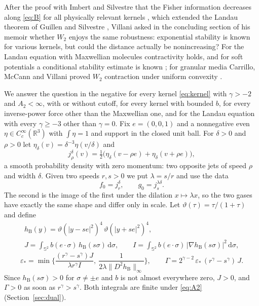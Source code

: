 \documentclass[11pt]{amsart}
\theoremstyle{definition}
\newcommand{\RR}{\mathbb{R}}
\newcommand{\Sph}{\mathbb{S}}
\newcommand{\dd}{\,\mathrm{d}}
\newcommand{\hB}{h_{\mathrm B}}
\begin{document}
After the proof with Imbert and Silvestre that the Fisher information decreases along \eqref{eq:B} for all physically relevant kernels \cite{ISV25}, which extended the Landau theorem of Guillen and Silvestre \cite{GS25}, Villani asked in the concluding section of his memoir \cite{Vil25} whether $W_2$ enjoys the same robustness: exponential stability is known for various kernels, but could the distance actually be nonincreasing? For the Landau equation with Maxwellian molecules contractivity holds, and for soft potentials a conditional stability estimate is known \cite{CDGT25}; for granular media Carrillo, McCann and Villani proved $W_2$ contraction under uniform convexity \cite{CMV05}.

We answer the question in the negative for every kernel \eqref{eq:kernel} with $\gamma>-2$ and $A_2<\infty$, with or without cutoff, for every kernel with bounded $b$, for every inverse-power force other than the Maxwellian one, and for the Landau equation with every $\gamma\ge-3$ other than $\gamma=0$. Fix $e=(0,0,1)$ and a nonnegative even $\eta\in C_c^\infty(\RR^3)$ with $\int\eta=1$ and support in the closed unit ball. For $\delta>0$ and $\rho>0$ let $\eta_\delta(v)=\delta^{-3}\eta(v/\delta)$ and
\begin{equation}\label{eq:data}
j^\delta_\rho(v)=\tfrac12\big(\eta_\delta(v-\rho e)+\eta_\delta(v+\rho e)\big),
\end{equation}
a smooth probability density with zero momentum: two opposite jets of speed $\rho$ and width $\delta$. Given two speeds $r,s>0$ we put $\lambda=s/r$ and use the data
\begin{equation}\label{eq:pairdata}
f_0=j^\delta_r,\qquad g_0=j^{\lambda\delta}_s .
\end{equation}
The second is the image of the first under the dilation $x\mapsto\lambda x$, so the two gases have exactly the same shape and differ only in scale. Let $\vartheta(\tau)=\tau/(1+\tau)$ and define
\begin{equation}\label{eq:J}
\begin{gathered}\hB(y)=\vartheta(|y-se|^2)^4\,\vartheta(|y+se|^2)^4,\\ J=\int_{\Sph^2}b(e\cdot\sigma)\,\hB(s\sigma)\dd\sigma,\qquad I=\int_{\Sph^2}b(e\cdot\sigma)\,|\nabla\hB(s\sigma)|^2\dd\sigma,\end{gathered}
\end{equation}
\begin{equation}\label{eq:Gamma}
\varepsilon_*=\min\Big\{\frac{(r^\gamma-s^\gamma)J}{\lambda r^\gamma I},\ \frac1{2\lambda\|D^2\hB\|_\infty}\Big\},\qquad \Gamma=2^{\gamma-2}\,\varepsilon_*\,(r^\gamma-s^\gamma)\,J .
\end{equation}
Since $\hB(s\sigma)>0$ for $\sigma\ne\pm e$ and $b$ is not almost everywhere zero, $J>0$, and $\Gamma>0$ as soon as $r^\gamma>s^\gamma$. Both integrals are finite under \eqref{eq:A2} (Section~\ref{sec:dual}).
\end{document}

